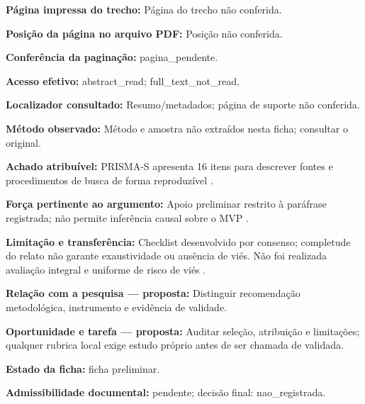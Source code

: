 \noindent\textbf{Página impressa do trecho:} Página do trecho não conferida.\par\medskip

\noindent\textbf{Posição da página no arquivo PDF:} Posição não conferida.\par\medskip

\noindent\textbf{Conferência da paginação:} pagina\_pendente.\par\medskip

\noindent\textbf{Acesso efetivo:} abstract\_read; full\_text\_not\_read.\par\medskip

\noindent\textbf{Localizador consultado:} Resumo/metadados; página de suporte não conferida.\par\medskip

\noindent\textbf{Método observado:} Método e amostra não extraídos nesta ficha; consultar o original.\par\medskip

\noindent\textbf{Achado atribuível:} PRISMA-S apresenta 16 itens para descrever fontes e procedimentos de busca de forma reproduzível \citep{SU03}.\par\medskip

\noindent\textbf{Força pertinente ao argumento:} Apoio preliminar restrito à paráfrase registrada; não permite inferência causal sobre o MVP \citep{SU03}.\par\medskip

\noindent\textbf{Limitação e transferência:} Checklist desenvolvido por consenso; completude do relato não garante exaustividade ou ausência de viés. Não foi realizada avaliação integral e uniforme de risco de viés \citep{SU03}.\par\medskip

\noindent\textbf{Relação com a pesquisa — proposta:} Distinguir recomendação metodológica, instrumento e evidência de validade.\par\medskip

\noindent\textbf{Oportunidade e tarefa — proposta:} Auditar seleção, atribuição e limitações; qualquer rubrica local exige estudo próprio antes de ser chamada de validada.\par\medskip

\noindent\textbf{Estado da ficha:} ficha preliminar.\par\medskip

\noindent\textbf{Admissibilidade documental:} pendente; decisão final: nao\_registrada.\par\medskip

